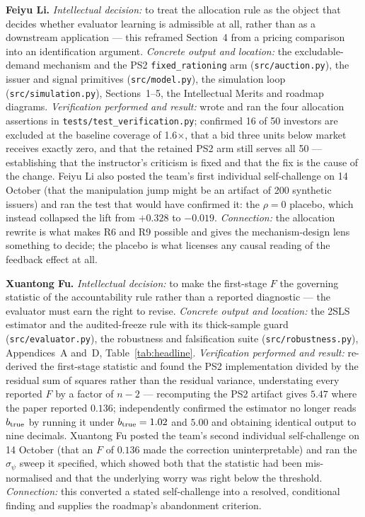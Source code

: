 \textbf{Feiyu Li.} \emph{Intellectual decision:} to treat the allocation rule as the object that decides whether evaluator learning is admissible at all, rather than as a downstream application --- this reframed Section~4 from a pricing comparison into an identification argument. \emph{Concrete output and location:} the excludable-demand mechanism and the PS2 \texttt{fixed\_rationing} arm (\texttt{src/auction.py}), the issuer and signal primitives (\texttt{src/model.py}), the simulation loop (\texttt{src/simulation.py}), Sections~1--5, the Intellectual Merits and roadmap diagrams. \emph{Verification performed and result:} wrote and ran the four allocation assertions in \texttt{tests/test\_verification.py}; confirmed 16 of 50 investors are excluded at the baseline coverage of 1.6$\times$, that a bid three units below market receives exactly zero, and that the retained PS2 arm still serves all 50 --- establishing that the instructor's criticism is fixed and that the fix is the cause of the change. Feiyu Li also posted the team's first individual self-challenge on 14 October (that the manipulation jump might be an artifact of 200 synthetic issuers) and ran the test that would have confirmed it: the $\rho=0$ placebo, which instead collapsed the lift from $+0.328$ to $-0.019$. \emph{Connection:} the allocation rewrite is what makes R6 and R9 possible and gives the mechanism-design lens something to decide; the placebo is what licenses any causal reading of the feedback effect at all.

\textbf{Xuantong Fu.} \emph{Intellectual decision:} to make the first-stage $F$ the governing statistic of the accountability rule rather than a reported diagnostic --- the evaluator must earn the right to revise. \emph{Concrete output and location:} the 2SLS estimator and the audited-freeze rule with its thick-sample guard (\texttt{src/evaluator.py}), the robustness and falsification suite (\texttt{src/robustness.py}), Appendices~A and~D, Table~\ref{tab:headline}. \emph{Verification performed and result:} re-derived the first-stage statistic and found the PS2 implementation divided by the residual sum of squares rather than the residual variance, understating every reported $F$ by a factor of $n{-}2$ --- recomputing the PS2 artifact gives $5.47$ where the paper reported $0.136$; independently confirmed the estimator no longer reads $b_{\rm true}$ by running it under $b_{\rm true}=1.02$ and $5.00$ and obtaining identical output to nine decimals. Xuantong Fu posted the team's second individual self-challenge on 14 October (that an $F$ of $0.136$ made the correction uninterpretable) and ran the $\sigma_\psi$ sweep it specified, which showed both that the statistic had been mis-normalised and that the underlying worry was right below the threshold. \emph{Connection:} this converted a stated self-challenge into a resolved, conditional finding and supplies the roadmap's abandonment criterion.

